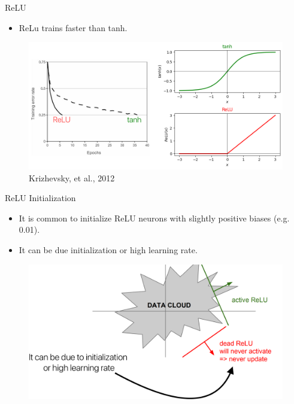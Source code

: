 \documentclass[serif, aspectratio=169]{beamer}
\begin{document}
\begin{frame}{ReLU}
	\begin{itemize}
		\item ReLu trains faster than tanh.
	\end{itemize}
	\begin{figure}[htbp]
		\begin{center}
			\includegraphics[keepaspectratio, scale=0.3]{pic/relu_faster}
			\caption*{\scriptsize Krizhevsky, et al., 2012}
		\end{center}
	\end{figure}
\end{frame}

\begin{frame}{ReLU Initialization}
	\begin{itemize}
		\item It is common to initialize ReLU neurons with slightly positive biases (e.g. 0.01).
		\item It can be due initialization or high learning rate.
	\end{itemize}
	\begin{figure}[htpb]
		\begin{center}
			\includegraphics[keepaspectratio, scale=0.15]{pic/dead_relu}
		\end{center}
	\end{figure}
\end{frame}
\end{document}
